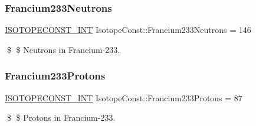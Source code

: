 \subsubsection{\texorpdfstring{Francium233\+Neutrons}{Francium233Neutrons}}
{\footnotesize\ttfamily \mbox{\hyperlink{group___isotope_const-_macros_ga5f18360b3e99483a35c32d789e62621c}{I\+S\+O\+T\+O\+P\+E\+C\+O\+N\+S\+T\+\_\+\+I\+NT}} Isotope\+Const\+::\+Francium233\+Neutrons = 146}

\$ \$ Neutrons in Francium-\/233. \mbox{\label{group___isotope_const-_francium-_fr233_ga9f34e22f53cf6a61fba37d840c9d4c6c}} 
\subsubsection{\texorpdfstring{Francium233\+Protons}{Francium233Protons}}
{\footnotesize\ttfamily \mbox{\hyperlink{group___isotope_const-_macros_ga5f18360b3e99483a35c32d789e62621c}{I\+S\+O\+T\+O\+P\+E\+C\+O\+N\+S\+T\+\_\+\+I\+NT}} Isotope\+Const\+::\+Francium233\+Protons = 87}

\$ \$ Protons in Francium-\/233. 